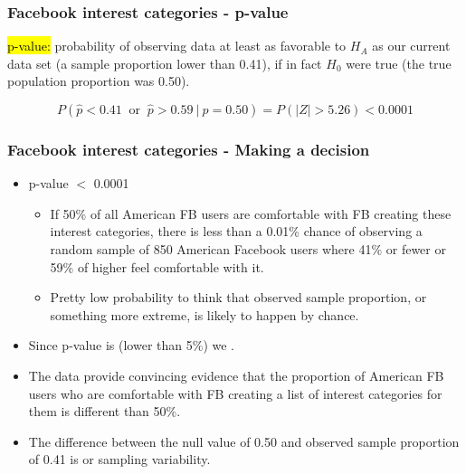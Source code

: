 
\begin{frame}
\frametitle{Facebook interest categories - p-value}

\hl{p-value:} probability of observing data at least as favorable to $H_A$ as our current data set (a sample proportion lower than 0.41), if in fact $H_0$ were true (the true population proportion was 0.50).

\pause

\[ P(\hat{p} < 0.41~\text{ or }~\hat{p} > 0.59~|~p = 0.50) = P(|Z| > 5.26) < 0.0001 \]

\end{frame}


\begin{frame}
\frametitle{Facebook interest categories - Making a decision}

\begin{itemize}

\item p-value $<$ 0.0001

\pause

\begin{itemize}
\item If 50\% of all American FB users are comfortable with FB creating these interest categories, there is less than a 0.01\% chance of observing a random sample of 850 American Facebook users where 41\% or fewer or 59\% of higher feel comfortable with it.
\pause
\item Pretty low probability to think that observed sample proportion, or something more extreme, is likely to happen by chance.
\end{itemize}

\pause
\item Since p-value is  (lower than 5\%) we .

\pause
\item The data provide convincing evidence that the proportion of American FB users who are comfortable with FB creating a list of interest categories for them is different than 50\%.

\pause
\item The difference between the null value of 0.50 and observed sample proportion of 0.41 is  or sampling variability.

\end{itemize}

\end{frame}

